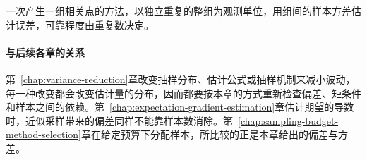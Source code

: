 一次产生一组相关点的方法，以独立重复的整组为观测单位，用组间的样本方差估计误差，可靠程度由重复数决定。

\paragraph{与后续各章的关系}
第~\ref{chap:variance-reduction}章改变抽样分布、估计公式或抽样机制来减小波动，每一种改变都会改变估计量的分布，因而都要按本章的方式重新检查偏差、矩条件和样本之间的依赖。第~\ref{chap:expectation-gradient-estimation}章估计期望的导数时，近似采样带来的偏差同样不能靠样本数消除。第~\ref{chap:sampling-budget-method-selection}章在给定预算下分配样本，所比较的正是本章给出的偏差与方差。
